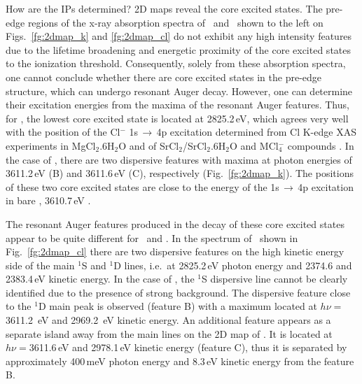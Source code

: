 {\color{red}How are the IPs determined? 2D maps reveal the core excited states.}
The pre-edge regions of the x-ray absorption spectra of \ki~and \cli~shown to the left on Figs.\ \ref{fg:2dmap_k} and \ref{fg:2dmap_cl} do not exhibit any high intensity features due to the lifetime broadening and energetic proximity of the core excited states to the ionization threshold. Consequently, solely from these absorption spectra, one cannot conclude whether there are core excited states in the pre-edge structure, which can undergo resonant Auger decay. However, one can determine their excitation energies from the maxima of the resonant Auger features. Thus, for \cli, the lowest core excited state is located at 2825.2\,eV, which agrees very well with the position of the Cl$^{-}$ 1s$\,\rightarrow\,$4p excitation determined from Cl K-edge XAS experiments in MgCl$_2$.6H$_2$O and of SrCl$_2$/SrCl$_2$.6H$_2$O \citep{sugiura82:681} and MCl$_{4}^{-}$ compounds \citep{shadle95:2259}. In the case of \ki, there are two dispersive features with maxima at photon energies of 3611.2\,eV (B) and 3611.6\,eV (C), respectively (Fig.\ \ref{fg:2dmap_k}). The positions of these two core excited states are close to the energy of the 1s$\,\rightarrow\,$4p excitation in bare \ki, 3610.7\,eV \citep{hertlein06:062715}.


The resonant Auger features produced in the decay of these core excited states appear to be quite different for \cli~and \ki. In the spectrum of \cli~shown in Fig.\ \ref{fg:2dmap_cl} there are two dispersive features on the high kinetic energy side of the main $^1$S and $^1$D lines, i.e.\ at 2825.2\,eV photon energy and 2374.6 and 2383.4\,eV kinetic energy. In the case of \ki, the $^1$S dispersive line cannot be clearly identified due to the presence of strong background. The dispersive feature close to the $^1$D main peak is observed (feature B) with a maximum located at $h\nu = $3611.2 \,eV and 2969.2 \,eV kinetic energy. An additional feature appears as a separate island away from the main lines on the 2D map of \ki. It is located at $h\nu = $3611.6\,eV and 2978.1\,eV kinetic energy (feature C), thus it is separated by approximately 400\,meV photon energy and 8.3\,eV kinetic energy from the feature B. 

